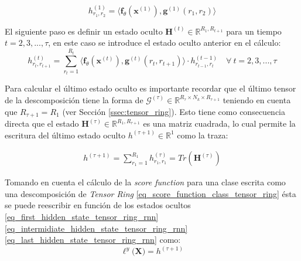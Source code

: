 \documentclass[spanish]{article}
\theoremstyle{definition}
\theoremstyle{remark}
\numberwithin{equation}{section}
\numberwithin{equation}{section} %
\begin{document}
\par 
\begin{equation}
\label{eq_first_hidden_state_tensor_ring_rnn}
h^{(1)}_{r_1,r_2}   
= \langle \boldsymbol{f}_\theta(\boldsymbol{x}^{(1)}),\boldsymbol{g}^{(1)}(r_1,r_2) \rangle
\end{equation} \par
El siguiente paso es definir un estado oculto $\boldsymbol{H}^{(t)} \in \mathbb{R}^{R_1,R_{t+1}}$ para un tiempo $t=2,3,...,\tau$, en este caso se introduce el estado oculto anterior en el cálculo:
\begin{equation}
\label{eq_intermidiate_hidden_state_tensor_ring_rnn}
h^{(t)}_{r_{t},r_{t+1}}  
= \sum^{R_{t}}_{r_{t}=1} \langle \boldsymbol{f}_\theta(\boldsymbol{x}^{(t)}),\boldsymbol{g}^{(t)}(r_t,r_{t+1}) \rangle \cdot h^{(t-1)}_{r_{t-1},r_t}  \quad \forall \ t=2,3,...,\tau
\end{equation} \par
Para calcular el último estado oculto es importante recordar que el último tensor de la descomposición tiene la forma de $\mathcal{G}^{(\tau)} \in \mathbb{R}^{R_\tau \times N_k \times R_{\tau+1}}$ teniendo en cuenta que $R_{\tau+1}=R_1$ (ver Sección \ref{ssec:tensor_ring}). Esto tiene como consecuencia directa que el estado $\boldsymbol{H}^{(\tau)} \in \mathbb{R}^{R_1,R_{\tau+1}}$ es una matriz cuadrada, lo cual permite la escritura del último estado oculto $h^{(\tau+1)} \in \mathbb{R}^1$ como la traza:\par
\begin{equation}
\label{eq_last_hidden_state_tensor_ring_rnn}
\begin{split}
h^{(\tau+1)} = \sum^{R_{1}}_{r_{1}=1}h^{(\tau)}_{r_1,r_1} = Tr(\boldsymbol{H}^{(\tau)})
\end{split}
\end{equation} \par
\par
Tomando en cuenta el cálculo de la \textit{score function} para una clase escrita como una descomposición de \textit{Tensor Ring} \eqref{eq_score_function_class_tensor_ring} ésta se puede reescribir en función de los estados ocultos \eqref{eq_first_hidden_state_tensor_ring_rnn} \eqref{eq_intermidiate_hidden_state_tensor_ring_rnn} \eqref{eq_last_hidden_state_tensor_ring_rnn} como:
\begin{equation}
\label{eq_score_function_with_hidden_state}
\ell^y\big(\boldsymbol{X}\big) = h^{(\tau+1)}
\end{equation}
\end{document}
